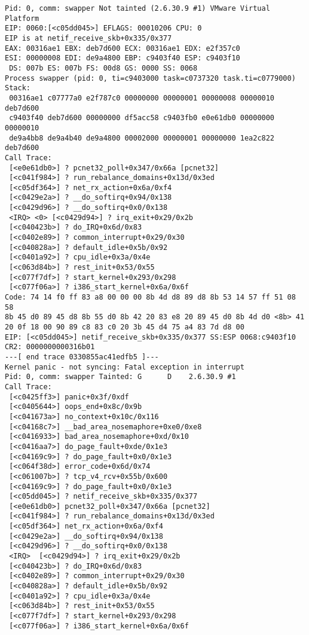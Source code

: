 \begin{lstlisting}
Pid: 0, comm: swapper Not tainted (2.6.30.9 #1) VMware Virtual Platform
EIP: 0060:[<c05dd045>] EFLAGS: 00010206 CPU: 0
EIP is at netif_receive_skb+0x335/0x377
EAX: 00316ae1 EBX: deb7d600 ECX: 00316ae1 EDX: e2f357c0
ESI: 00000008 EDI: de9a4800 EBP: c9403f40 ESP: c9403f10
 DS: 007b ES: 007b FS: 00d8 GS: 0000 SS: 0068
Process swapper (pid: 0, ti=c9403000 task=c0737320 task.ti=c0779000)
Stack:
 00316ae1 c07777a0 e2f787c0 00000000 00000001 00000008 00000010 deb7d600
 c9403f40 deb7d600 00000000 df5acc58 c9403fb0 e0e61db0 00000000 00000010
 de9a4bb8 de9a4b40 de9a4800 00002000 00000001 00000000 1ea2c822 deb7d600
Call Trace:
 [<e0e61db0>] ? pcnet32_poll+0x347/0x66a [pcnet32]
 [<c041f984>] ? run_rebalance_domains+0x13d/0x3ed
 [<c05df364>] ? net_rx_action+0x6a/0xf4
 [<c0429e2a>] ? __do_softirq+0x94/0x138
 [<c0429d96>] ? __do_softirq+0x0/0x138
 <IRQ> <0> [<c0429d94>] ? irq_exit+0x29/0x2b
 [<c040423b>] ? do_IRQ+0x6d/0x83
 [<c0402e89>] ? common_interrupt+0x29/0x30
 [<c040828a>] ? default_idle+0x5b/0x92
 [<c0401a92>] ? cpu_idle+0x3a/0x4e
 [<c063d84b>] ? rest_init+0x53/0x55
 [<c077f7df>] ? start_kernel+0x293/0x298
 [<c077f06a>] ? i386_start_kernel+0x6a/0x6f
Code: 74 14 f0 ff 83 a8 00 00 00 8b 4d d8 89 d8 8b 53 14 57 ff 51 08 58 
8b 45 d0 89 45 d8 8b 55 d0 8b 42 20 83 e8 20 89 45 d0 8b 4d d0 <8b> 41 
20 0f 18 00 90 89 c8 83 c0 20 3b 45 d4 75 a4 83 7d d8 00
EIP: [<c05dd045>] netif_receive_skb+0x335/0x377 SS:ESP 0068:c9403f10
CR2: 0000000000316b01
---[ end trace 0330855ac41edfb5 ]---
Kernel panic - not syncing: Fatal exception in interrupt
Pid: 0, comm: swapper Tainted: G      D    2.6.30.9 #1
Call Trace:
 [<c0425ff3>] panic+0x3f/0xdf
 [<c0405644>] oops_end+0x8c/0x9b
 [<c041673a>] no_context+0x10c/0x116
 [<c04168c7>] __bad_area_nosemaphore+0xe0/0xe8
 [<c0416933>] bad_area_nosemaphore+0xd/0x10
 [<c0416aa7>] do_page_fault+0xde/0x1e3
 [<c04169c9>] ? do_page_fault+0x0/0x1e3
 [<c064f38d>] error_code+0x6d/0x74
 [<c061007b>] ? tcp_v4_rcv+0x55b/0x600
 [<c04169c9>] ? do_page_fault+0x0/0x1e3
 [<c05dd045>] ? netif_receive_skb+0x335/0x377
 [<e0e61db0>] pcnet32_poll+0x347/0x66a [pcnet32]
 [<c041f984>] ? run_rebalance_domains+0x13d/0x3ed
 [<c05df364>] net_rx_action+0x6a/0xf4
 [<c0429e2a>] __do_softirq+0x94/0x138
 [<c0429d96>] ? __do_softirq+0x0/0x138
 <IRQ>  [<c0429d94>] ? irq_exit+0x29/0x2b
 [<c040423b>] ? do_IRQ+0x6d/0x83
 [<c0402e89>] ? common_interrupt+0x29/0x30
 [<c040828a>] ? default_idle+0x5b/0x92
 [<c0401a92>] ? cpu_idle+0x3a/0x4e
 [<c063d84b>] ? rest_init+0x53/0x55
 [<c077f7df>] ? start_kernel+0x293/0x298
 [<c077f06a>] ? i386_start_kernel+0x6a/0x6f
\end{lstlisting}


